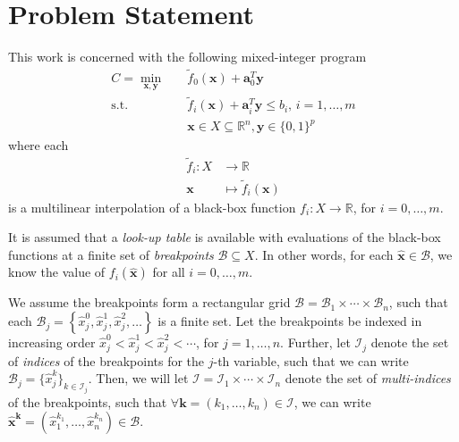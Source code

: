 \documentclass[pdflatex,sn-mathphys-num]{sn-jnl}%
\newcommand{\new}[1]{#1}
\newcommand{\R}{\mathbb{R}}
\begin{document}

\section{Problem Statement} \label{problem}

This work is concerned with the following  mixed-integer program
\begin{equation}\label{eq:problem}
\begin{split}
    C = \min_{\bm{x},\bm{y}} \quad & \widetilde{f}_0(\bm{x}) + \bm{a}_0^{T} \bm{y}  \\
    \textrm{s.t.} \quad & \widetilde{f}_i(\bm{x}) + \bm{a}_i^{T} \bm{y} \le b_i,\,i=1,\ldots,m \\
      & \bm{x}\in X\subseteq\R^{n}, \bm{y}\in \{0,1\}^{p}
\end{split}
\end{equation}
where each
\begin{equation}
    \begin{split}
	\widetilde{f}_i: X &\longrightarrow \R \\
	\bm{x} &\longmapsto \widetilde{f}_i(\bm{x})
    \end{split}
\end{equation}
\new{is a multilinear interpolation of a black-box function $f_i:X \rightarrow \R$, for $i=0,\ldots,m$.}

\new{%
It is assumed that a \emph{look-up table} is available with evaluations of the black-box functions at a finite set of \emph{breakpoints} $\mathcal{B} \subseteq X$.
In other words, for each $\hat{\bm{x}} \in\mathcal{B}$, we know the value of $f_i(\hat{\bm{x}})$ for all $i=0,\ldots,m$.
}

\new{%
We assume the breakpoints form a rectangular grid $\mathcal{B}=\mathcal{B}_1\times \cdots\times \mathcal{B}_n$, such that each $\mathcal{B}_j = \left\{ \hat{x}_j^{0},\hat{x}_{j}^{1},\hat{x}_{j}^{2},\ldots \right\}$ is a finite set.
Let the breakpoints be indexed in increasing order $\hat{x}^{0}_j<\hat{x}^{1}_j<\hat{x}_{j}^{2}<\cdots$, for $j=1,\ldots,n$.
Further, let $\mathcal{I}_j$ denote the set of \emph{indices} of the breakpoints for the $j$-th variable, such that we can write $\mathcal{B}_j = \{\hat{x}_j^{k}\}_{k\in\mathcal{I}_j}$.
Then, we will let $\mathcal{I}=\mathcal{I}_1\times \cdots \times \mathcal{I}_n$ denote the set of \emph{multi-indices} of the breakpoints, such that $\forall \bm{k}=(k_1,\ldots,k_n)\in\mathcal{I}$, we can write $\hat{\bm{x}}^{\bm{k}} = (\hat{x}_1^{k_1},\ldots,\hat{x}_n^{k_n})\in \mathcal{B}$.
}
\end{document}
